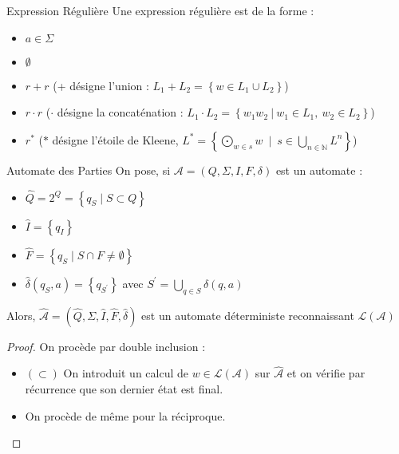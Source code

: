 \documentclass{cours}
\begin{document}
\begin{définition}{Expression Régulière}{}
    Une expression régulière est de la forme : 
    \begin{itemize}
        \item $a \in \Sigma$ 
        \item $\emptyset$
        \item $r + r$ (+ désigne l'union : $L_1 + L_2 = \left\{w \in L_{1} \cup L_{2} \right\}$)
        \item $r \cdot r$ ($\cdot$ désigne la concaténation : $L_1 \cdot L_2 = \left\{w_{1}w_{2} \ | \ w_{1} \in L_{1}, \ w_{2} \in L_{2} \right\}$)
        \item $r^{*}$ ($*$ désigne l'étoile de Kleene, $L^{*} = \left\{ \bigodot\limits_{w \in s} w \ \mid \ s \in \bigcup\limits_{n \in \mathbb{N}} L^{n} \right\}$)
    \end{itemize}
\end{définition}

\begin{définition}{Automate des Parties}{}
    On pose, si $\mathcal{A} = (Q, \Sigma, I, F, \delta)$ est un automate : 
    \begin{itemize}
        \item $\hat{Q} = 2^{Q} = \left\{q_{S} \mid S \subset Q\right\}$
        \item $\hat{I} = \left\{q_{I}\right\}$
        \item $\hat{F} = \left\{q_{S} \mid S \cap F \neq \emptyset \right\}$
        \item $\hat{\delta}(q_{S}, a) = \left\{q_{S^{'}}\right\}$ avec $S^{'} = \bigcup\limits_{q \in S}\delta(q, a)$
    \end{itemize}
    Alors, $\hat{\mathcal{A}} = (\hat{Q}, \Sigma, \hat{I}, \hat{F}, \hat{\delta})$ est un automate déterministe reconnaissant $\mathcal{L}(\mathcal{A})$
\end{définition}

\begin{proof}
    On procède par double inclusion :
    \begin{itemize}
        \item $(\subset)$ On introduit un calcul de $w \in \mathcal{L}(\mathcal{A})$ sur $\hat{\mathcal{A}}$ et on vérifie par récurrence que son dernier état est final.
        \item On procède de même pour la réciproque.
    \end{itemize}
\end{proof}
\end{document}
